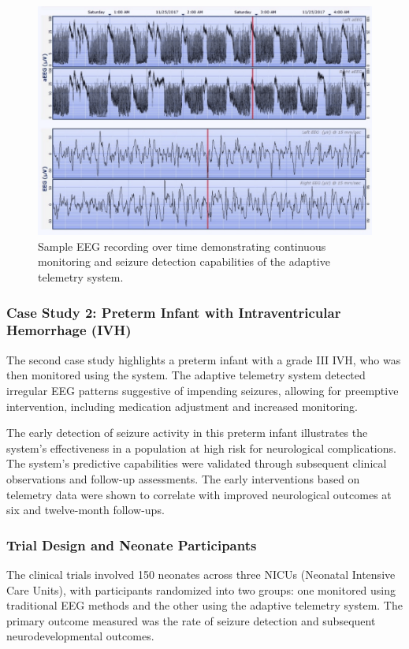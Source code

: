 \documentclass[12pt,journal,compsoc]{IEEEtran}
\begin{document}
\begin{figure}[H]
    \centering
    \includegraphics[width=0.8\linewidth]{case_studies_aEEG_vs_EEG.png}
    \caption{Sample EEG recording over time demonstrating continuous monitoring and seizure detection capabilities of the adaptive telemetry system.}
    \label{fig:eeg_data}
\end{figure}

\subsubsection{Case Study 2: Preterm Infant with Intraventricular Hemorrhage (IVH)}

The second case study highlights a preterm infant with a grade III IVH, who was then monitored using the system. The adaptive telemetry system detected irregular EEG patterns suggestive of impending seizures, allowing for preemptive intervention, including medication adjustment and increased monitoring. 

The early detection of seizure activity in this preterm infant illustrates the system's effectiveness in a population at high risk for neurological complications. The system's predictive capabilities were validated through subsequent clinical observations and follow-up assessments. The early interventions based on telemetry data were shown to correlate with improved neurological outcomes at six and twelve-month follow-ups.  

\subsubsection{Trial Design and Neonate Participants}

The clinical trials involved 150 neonates across three NICUs (Neonatal Intensive Care Units), with participants randomized into two groups: one monitored using traditional EEG methods and the other using the adaptive telemetry system. The primary outcome measured was the rate of seizure detection and subsequent neurodevelopmental outcomes.
\end{document}
